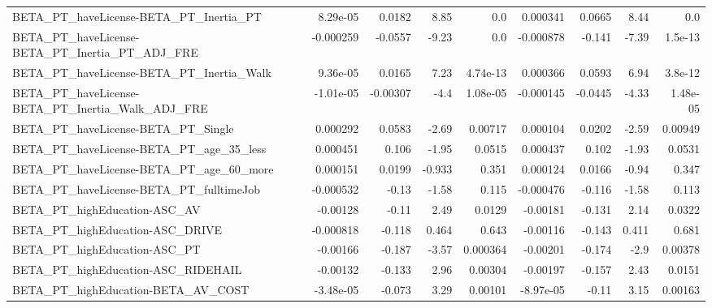 \begin{tabular}{lrrrrrrrr}
BETA\_PT\_haveLicense-BETA\_PT\_Inertia\_PT             &    8.29e-05 &       0.0182 &     8.85 &      0.0 &   0.000341 &      0.0665 &         8.44 &           0.0 \\
BETA\_PT\_haveLicense-BETA\_PT\_Inertia\_PT\_ADJ\_FRE     &   -0.000259 &      -0.0557 &    -9.23 &      0.0 &  -0.000878 &      -0.141 &        -7.39 &       1.5e-13 \\
BETA\_PT\_haveLicense-BETA\_PT\_Inertia\_Walk           &    9.36e-05 &       0.0165 &     7.23 & 4.74e-13 &   0.000366 &      0.0593 &         6.94 &       3.8e-12 \\
BETA\_PT\_haveLicense-BETA\_PT\_Inertia\_Walk\_ADJ\_FRE   &   -1.01e-05 &     -0.00307 &     -4.4 & 1.08e-05 &  -0.000145 &     -0.0445 &        -4.33 &      1.48e-05 \\
BETA\_PT\_haveLicense-BETA\_PT\_Single                 &    0.000292 &       0.0583 &    -2.69 &  0.00717 &   0.000104 &      0.0202 &        -2.59 &       0.00949 \\
BETA\_PT\_haveLicense-BETA\_PT\_age\_35\_less            &    0.000451 &        0.106 &    -1.95 &   0.0515 &   0.000437 &       0.102 &        -1.93 &        0.0531 \\
BETA\_PT\_haveLicense-BETA\_PT\_age\_60\_more            &    0.000151 &       0.0199 &   -0.933 &    0.351 &   0.000124 &      0.0166 &        -0.94 &         0.347 \\
BETA\_PT\_haveLicense-BETA\_PT\_fulltimeJob            &   -0.000532 &        -0.13 &    -1.58 &    0.115 &  -0.000476 &      -0.116 &        -1.58 &         0.113 \\
BETA\_PT\_highEducation-ASC\_AV                       &    -0.00128 &        -0.11 &     2.49 &   0.0129 &   -0.00181 &      -0.131 &         2.14 &        0.0322 \\
BETA\_PT\_highEducation-ASC\_DRIVE                    &   -0.000818 &       -0.118 &    0.464 &    0.643 &   -0.00116 &      -0.143 &        0.411 &         0.681 \\
BETA\_PT\_highEducation-ASC\_PT                       &    -0.00166 &       -0.187 &    -3.57 & 0.000364 &   -0.00201 &      -0.174 &         -2.9 &       0.00378 \\
BETA\_PT\_highEducation-ASC\_RIDEHAIL                 &    -0.00132 &       -0.133 &     2.96 &  0.00304 &   -0.00197 &      -0.157 &         2.43 &        0.0151 \\
BETA\_PT\_highEducation-BETA\_AV\_COST                 &   -3.48e-05 &       -0.073 &     3.29 &  0.00101 &  -8.97e-05 &       -0.11 &         3.15 &       0.00163 \\

\end{tabular}
